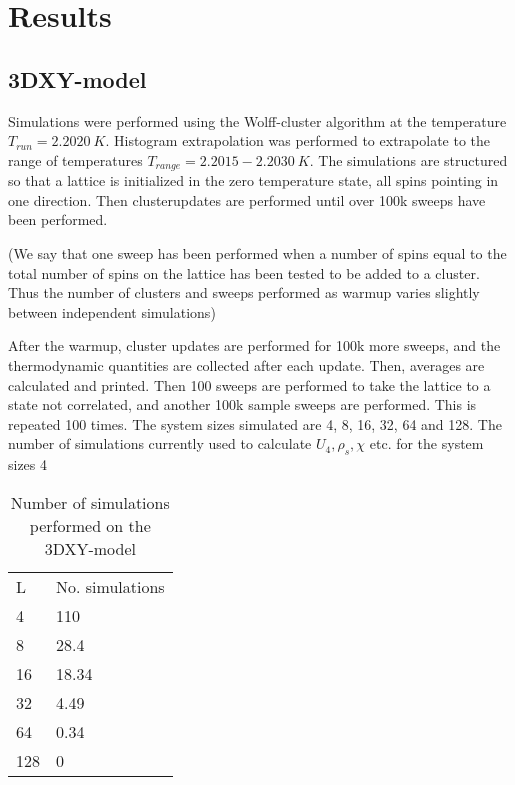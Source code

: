\documentclass[a4paper]{article}
\begin{document}
\section{Results}
\subsection{3DXY-model}
Simulations were performed using the Wolff-cluster algorithm at the temperature $T_{run} = 2.2020~K$. Histogram extrapolation was performed to extrapolate to the range of temperatures $T_{range} = 2.2015-2.2030 ~ K$.
The simulations are structured so that a lattice is initialized in the zero temperature state, all spins pointing in one direction. Then clusterupdates are performed until over 100k sweeps have been performed.

(We say that one sweep has been performed when a number of spins equal to the total number of spins on the lattice has been tested to be added to a cluster.
Thus the number of clusters and sweeps performed as warmup varies slightly between independent simulations)

After the warmup, cluster updates are performed for 100k more sweeps, and the thermodynamic quantities are collected after each update. Then, averages are calculated and printed. Then 100 sweeps are performed to take the lattice to a state not correlated, and another 100k sample sweeps are performed. This is repeated 100 times. The system sizes simulated are 4, 8, 16, 32, 64 and 128. 
The number of simulations currently used to calculate $U_4, \rho_s, \chi $ etc. for the system sizes 4

\begin{table}[htpb]
\begin{center}
\begin{tabular}{l l }
  L & No. simulations\\
  4 & 110 \\
  8 & 28.4 \\
  16 & 18.34 \\
  32 & 4.49 \\
  64 & 0.34 \\
  128 & 0 \\
\end{tabular}
\end{center}
\caption{Number of simulations performed on the 3DXY-model}
\end{table}


\clearpage
\end{document}
